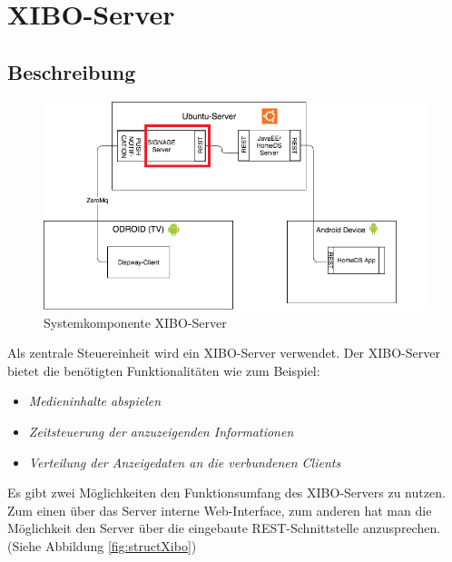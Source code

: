 \chapter{XIBO-Server}
\section{Beschreibung}
\begin{figure}[H]
\centering
\includegraphics[width=1.0\textwidth]{images/03_XIBO-Server/03_SystemArch}
\caption{Systemkomponente XIBO-Server}
\label{fig:mediaNav}
\end{figure}

Als zentrale Steuereinheit wird ein XIBO-Server verwendet. Der XIBO-Server bietet die benötigten Funktionalitäten wie zum Beispiel:
\begin{itemize}
	\item {\em Medieninhalte abspielen} 
	\item {\em Zeitsteuerung der anzuzeigenden Informationen}  
	\item {\em Verteilung der Anzeigedaten an die verbundenen Clients} 
\end{itemize}
Es gibt zwei Möglichkeiten den Funktionsumfang des XIBO-Servers zu nutzen. Zum einen über das Server interne Web-Interface, zum anderen hat man die  Möglichkeit den Server über die eingebaute REST-Schnittstelle anzusprechen.(Siehe Abbildung \ref{fig:structXibo})
\cite{xibo-server}

